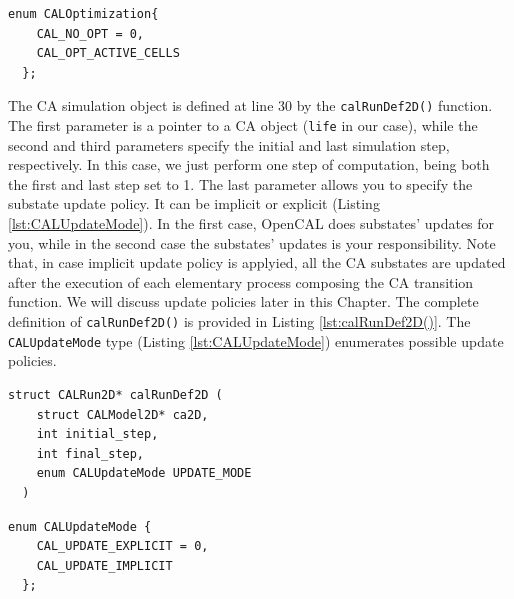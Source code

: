 \begin{lstlisting}[float,floatplacement=H, label=lst:CALOptimization, caption=The CALOptimization enum type., numbers=none]
  enum CALOptimization{
    CAL_NO_OPT = 0,
    CAL_OPT_ACTIVE_CELLS        
  };
\end{lstlisting}

The CA simulation object is defined at line 30 by the
\verb'calRunDef2D()' function. The first parameter is a pointer to a
CA object (\verb'life' in our case), while the second and third
parameters specify the initial and last simulation step,
respectively. In this case, we just perform one step of computation,
being both the first and last step set to 1. The last parameter allows
you to specify the substate update policy. It can be implicit or
explicit (Listing \ref{lst:CALUpdateMode}). In the first case, OpenCAL
does substates' updates for you, while in the second case the
substates' updates is your responsibility. Note that, in case implicit
update policy is applyied, all the CA substates are updated after the
execution of each elementary process composing the CA transition
function. We will discuss update policies later in this Chapter. The
complete definition of \verb'calRunDef2D()' is provided in Listing
\ref{lst:calRunDef2D()}. The \verb'CALUpdateMode' type (Listing
\ref{lst:CALUpdateMode}) enumerates possible update policies.

\begin{lstlisting}[float,floatplacement=H, label=lst:calRunDef2D(), caption=Definition of the calRunDef2D() function., numbers=none]
  struct CALRun2D* calRunDef2D (
    struct CALModel2D* ca2D,
    int initial_step,
    int final_step,
    enum CALUpdateMode UPDATE_MODE
  )	
\end{lstlisting}

\begin{lstlisting}[float,floatplacement=H, label=lst:CALUpdateMode, caption=The CALUpdateMode enum type., numbers=none]
  enum CALUpdateMode {
    CAL_UPDATE_EXPLICIT = 0,
    CAL_UPDATE_IMPLICIT
  };
\end{lstlisting}

